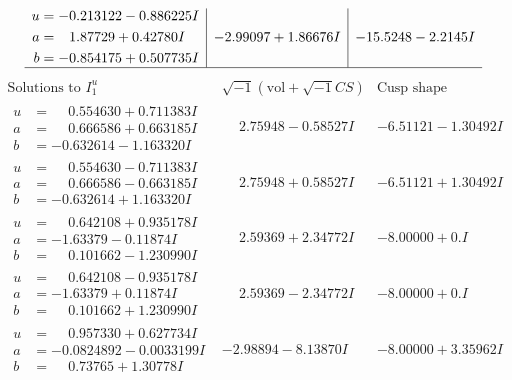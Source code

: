 \documentclass[1p]{elsarticle_modified}
\theoremstyle{definition}
\newcommand{\I}{\sqrt{-1}}
\begin{document}
$$\begin{array}{c|c|c}
\begin{aligned}
u &= -0.213122 - 0.886225 I \\
a &= \phantom{-}1.87729 + 0.42780 I \\
b &= -0.854175 + 0.507735 I\end{aligned}
 & -2.99097 + 1.86676 I & -15.5248 - 2.2145 I\\
 \hline 
 \end{array}$$\newpage$$\begin{array}{c|c|c}  
\text{Solutions to }I^u_{1}& \I (\text{vol} + \sqrt{-1}CS) & \text{Cusp shape}\\
 \hline 
\begin{aligned}
u &= \phantom{-}0.554630 + 0.711383 I \\
a &= \phantom{-}0.666586 + 0.663185 I \\
b &= -0.632614 - 1.163320 I\end{aligned}
 & \phantom{-}2.75948 - 0.58527 I & -6.51121 - 1.30492 I \\ \hline\begin{aligned}
u &= \phantom{-}0.554630 - 0.711383 I \\
a &= \phantom{-}0.666586 - 0.663185 I \\
b &= -0.632614 + 1.163320 I\end{aligned}
 & \phantom{-}2.75948 + 0.58527 I & -6.51121 + 1.30492 I \\ \hline\begin{aligned}
u &= \phantom{-}0.642108 + 0.935178 I \\
a &= -1.63379 - 0.11874 I \\
b &= \phantom{-}0.101662 - 1.230990 I\end{aligned}
 & \phantom{-}2.59369 + 2.34772 I & -8.00000 + 0. I\phantom{ +0.000000I} \\ \hline\begin{aligned}
u &= \phantom{-}0.642108 - 0.935178 I \\
a &= -1.63379 + 0.11874 I \\
b &= \phantom{-}0.101662 + 1.230990 I\end{aligned}
 & \phantom{-}2.59369 - 2.34772 I & -8.00000 + 0. I\phantom{ +0.000000I} \\ \hline\begin{aligned}
u &= \phantom{-}0.957330 + 0.627734 I \\
a &= -0.0824892 - 0.0033199 I \\
b &= \phantom{-}0.73765 + 1.30778 I\end{aligned}
 & -2.98894 - 8.13870 I & -8.00000 + 3.35962 I \\ \hline\begin{aligned}

\end{aligned}
\end{array}$$
\end{document}
